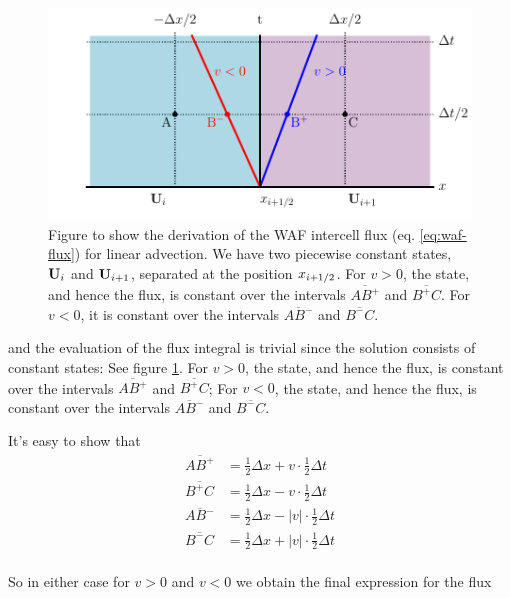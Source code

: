\begin{figure}[htbp]
	\includegraphics[width=\textwidth]{./figures/WAF.pdf}%
	\caption{Figure to show the derivation of the WAF intercell flux (eq. \ref{eq:waf-flux}) for linear advection.
		We have two piecewise constant states, $\mathbf{U}_i$ and $\mathbf{U}_{i+1}$, separated at the position $x_{i+1/2}$.
		For $v > 0$, the state, and hence the flux, is constant over the intervals $\overline{AB^+}$ and $\overline{B^+C}$.
		For $v < 0$, it is constant over the intervals $\overline{AB^-}$ and $\overline{B^-C}$.
		\label{fig:waf}
	}
\end{figure}



and the evaluation of the flux integral is trivial since the solution consists of constant states:
See figure \ref{fig:waf}.
For $v > 0$, the state, and hence the flux, is constant over the intervals $\overline{AB^+}$ and $\overline{B^+C}$;
For $v < 0$, the state, and hence the flux, is constant over the intervals $\overline{AB^-}$ and $\overline{B^-C}$.

It's easy to show that
\begin{align*}
	\overline{AB^+} &= \frac{1}{2} \Delta x + v \cdot \frac{1}{2} \Delta t\\
	\overline{B^+C} &= \frac{1}{2} \Delta x - v \cdot \frac{1}{2} \Delta t\\
	\overline{AB^-} &= \frac{1}{2} \Delta x - |v| \cdot \frac{1}{2} \Delta t\\
	\overline{B^-C} &= \frac{1}{2} \Delta x + |v| \cdot \frac{1}{2} \Delta t\\
\end{align*}









So in either case for $v > 0$ and $v < 0$ we obtain the final expression for the flux

